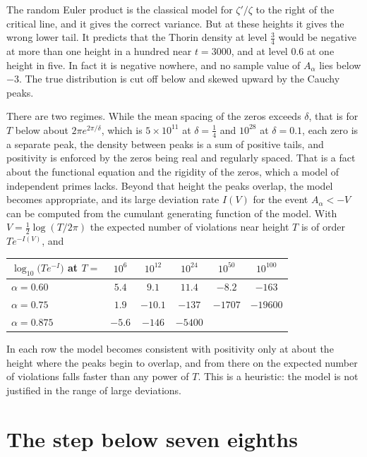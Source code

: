 The random Euler product is the classical model for $\zeta'/\zeta$ to the right of the critical line, and it gives the correct variance. But at these heights it gives the wrong lower tail. It predicts that the Thorin density at level $\frac34$ would be negative at more than one height in a hundred near $t=3000$, and at level $0.6$ at one height in five. In fact it is negative nowhere, and no sample value of $A_\alpha$ lies below $-3$. The true distribution is cut off below and skewed upward by the Cauchy peaks.

There are two regimes. While the mean spacing of the zeros exceeds $\delta$, that is for $T$ below about $2\pi e^{2\pi/\delta}$, which is $5\times10^{11}$ at $\delta=\frac14$ and $10^{28}$ at $\delta=0.1$, each zero is a separate peak, the density between peaks is a sum of positive tails, and positivity is enforced by the zeros being real and regularly spaced. That is a fact about the functional equation and the rigidity of the zeros, which a model of independent primes lacks. Beyond that height the peaks overlap, the model becomes appropriate, and its large deviation rate $I(V)$ for the event $A_\alpha<-V$ can be computed from the cumulant generating function of the model. With $V=\frac12\log(T/2\pi)$ the expected number of violations near height $T$ is of order $Te^{-I(V)}$, and
\begin{center}\small
\begin{tabular}{@{}lccccc@{}}
\toprule
$\log_{10}\bigl(Te^{-I}\bigr)$ at $T=$ & $10^6$ & $10^{12}$ & $10^{24}$ & $10^{50}$ & $10^{100}$\\
\midrule
$\alpha=0.60$ & $5.4$ & $9.1$ & $11.4$ & $-8.2$ & $-163$\\
$\alpha=0.75$ & $1.9$ & $-10.1$ & $-137$ & $-1707$ & $-19600$\\
$\alpha=0.875$ & $-5.6$ & $-146$ & $-5400$ & & \\
\bottomrule
\end{tabular}
\end{center}
In each row the model becomes consistent with positivity only at about the height where the peaks begin to overlap, and from there on the expected number of violations falls faster than any power of $T$. This is a heuristic: the model is not justified in the range of large deviations.

\section{The step below seven eighths}\label{bo:sec:stepbelow}

